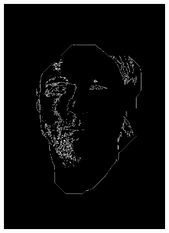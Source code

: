 \begin{figure}[H]
\begin{subfigure}{.16\textwidth}
  \includegraphics[width=0.95\textwidth]{img/fd3/grayFaceSpecialFilteredFaceMask.png}
  \caption{}
\end{subfigure}%
\begin{subfigure}{.16\textwidth}
  \centering

\end{subfigure}
\end{figure}
